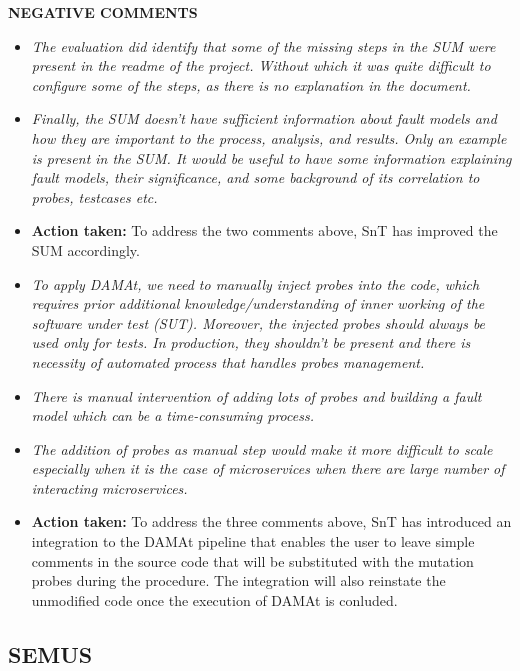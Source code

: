 \textbf{NEGATIVE COMMENTS}

\begin{itemize}

  \item \emph{The evaluation did identify that some of the missing steps in the SUM were present in the readme of the project. Without which it was quite difficult to configure some of the steps, as there is no explanation in the document.}

  \item \emph{Finally, the SUM doesn’t have sufficient information about fault models and how they are important to the process, analysis, and results. Only an example is present in the SUM. It would be useful to have some information explaining fault models, their significance, and some background of its correlation to probes, testcases etc.}

  \item \textbf{Action taken:} To address the two comments above, SnT has improved the SUM accordingly.

  \item \emph{To apply DAMAt, we need to manually inject probes into the code, which requires prior additional knowledge/understanding of inner working of the software under test (SUT). Moreover, the injected probes should always be used only for tests. In production, they shouldn’t be present and there is necessity of automated process that handles probes management.}

  \item \emph{There is manual intervention of adding lots of probes and building a fault model which can be a time-consuming process.}

  \item \emph{The addition of probes as manual step would make it more difficult to scale especially when it is the case of microservices when there are large number of interacting microservices.}

  \item \textbf{Action taken:} To address the three comments above, SnT has introduced an integration to the DAMAt pipeline that enables the user to leave simple comments in the source code that will be substituted with the mutation probes during the procedure. The integration will also reinstate the unmodified code once the execution of DAMAt is conluded.

\end{itemize}

\subsection{SEMUS} \ \\

